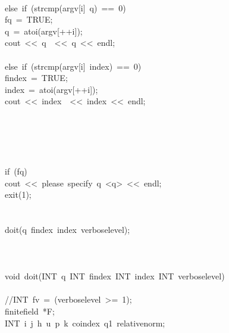 \begin{tabbing}
\>\>\>\\[0pt]
\>\>else\ if\ (strcmp(argv[i]\ q)\ ==\ 0)\ \\[0pt]
\>\>\>fq\ =\ TRUE;\\[0pt]
\>\>\>q\ =\ atoi(argv[++i]);\\[0pt]
\>\>\>cout\ <<\ q\ \ <<\ q\ <<\ endl;\\[0pt]
\>\>\>\\[0pt]
\>\>else\ if\ (strcmp(argv[i]\ index)\ ==\ 0)\ \\[0pt]
\>\>\>findex\ =\ TRUE;\\[0pt]
\>\>\>index\ =\ atoi(argv[++i]);\\[0pt]
\>\>\>cout\ <<\ index\ \ <<\ index\ <<\ endl;\\[0pt]
\>\>\>\\[0pt]
\>\>\\[0pt]
\>\\[0pt]
\\[0pt]
\\[0pt]
\>if\ (fq)\ \\[0pt]
\>\>cout\ <<\ please\ specify\ q\ <q>\ <<\ endl;\\[0pt]
\>\>exit(1);\\[0pt]
\>\>\\[0pt]
\\[0pt]
\>doit(q\ findex\ index\ verboselevel);\\[0pt]
\>\\[0pt]
\\[0pt]
\\[0pt]
void\ doit(INT\ q\ INT\ findex\ INT\ index\ INT\ verboselevel)\\[0pt]
\\[0pt]
\>//INT\ fv\ =\ (verboselevel\ >=\ 1);\\[0pt]
\>finitefield\ *F;\\[0pt]
\>INT\ i\ j\ h\ u\ p\ k\ coindex\ q1\ relativenorm;\\[0pt]

\end{tabbing}
